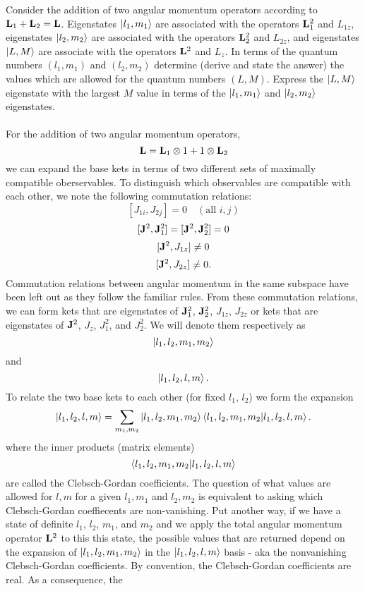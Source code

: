 \documentclass[11pt,letterpaper]{article}
\begin{document}
		\item
		Consider the addition of two angular momentum operators according to $\mathbf{L}_1 + \mathbf{L}_2 = \mathbf{L}$. Eigenstates
		$\ket{l_1,m_1}$ are associated with the operators $\mathbf{L}_1^2$ and $L_{1z}$, eigenstates $\ket{l_2,m_2}$ are associated
		with the operators $\mathbf{L}_2^2$ and $L_{2z}$, and eigenstates $\ket{L,M}$ are associate with the operators 
		$\mathbf{L}^2$ and $L_z$. In terms of the quantum numbers $(l_1,m_1)$ and $(l_2,m_2)$ determine (derive and state the
		answer) the values which are allowed for the quantum numbers $(L,M)$. Express the $\ket{L,M}$ eigenstate with the largest
		$M$ value in terms of the $\ket{l_1,m_1}$ and $\ket{l_2,m_2}$ eigenstates. 
		\\
		\\
		For the addition of two angular momentum operators, 
		\[
			\mathbf{L} = \mathbf{L}_1 \otimes 1 +1 \otimes  \mathbf{L}_2
		\] 
		we can expand the base kets in terms of two different sets of maximally compatible oberservables. To distinguish which observables 
		are compatible with each other, we note the following commutation relations:
		\[
			[J_{1i}, J_{2j}] = 0 \quad (\text{all } i,j)
		\]
		\[
			[\mathbf{J}^2,\mathbf{J}_1^2] = [\mathbf{J}^2,\mathbf{J}_2^2] = 0
		\]
		\[
			[\mathbf{J}^2,J_{1z}] \ne 0
		\] 
		\[
			[\mathbf{J}^2,J_{2z}] \ne 0.
		\]
		Commutation relations between angular momentum in the same subspace have been left out as they follow the familiar
		rules. From these commutation relations, we can form kets that are eigenstates of $\mathbf{J}_1^2$, $\mathbf{J}_2^2$, $J_{1z}$, 
		$J_{2z}$ or kets that are eigenstates of $\mathbf{J}^2$, $J_z$, $J_1^2$, and $J_2^2$. We will denote them respectively as
		\[
			\ket{l_1,l_2,m_1,m_2}
		\]
		and
		\[
			\ket{l_1,l_2,l,m}.
		\]
		To relate the two base kets to each other (for fixed $l_1$, $l_2$) we form the expansion
		\[
			\ket{l_1,l_2,l,m} = \sum_{m_1,m_2} \ket{l_1,l_2,m_1,m_2}\braket{l_1,l_2,m_1,m_2|l_1,l_2,l,m}.
		\]
		where the inner products (matrix elements)
		\[
			\braket{l_1,l_2,m_1,m_2|l_1,l_2,l,m}
		\]
		are called the Clebsch-Gordan coefficients. The question of what values are allowed for $l,m$ for a given $l_1,m_1$ and $l_2,m_2$
		is equivalent to asking which Clebsch-Gordan coeffiecents are non-vanishing. Put another way, if we have a state of definite $l_1$, 
		$l_2$, $m_1$, and $m_2$ and we apply the total angular momentum operator $\mathbf{L}^2$ to this this state, the possible values
		that are returned depend on the expansion of $\ket{l_1,l_2,m_1,m_2}$ in the $\ket{l_1,l_2,l,m}$ basis - aka the 
		nonvanishing Clebsch-Gordan coefficients. By convention, the Clebsch-Gordan coefficients are real. As a consequence, the
\end{document}
